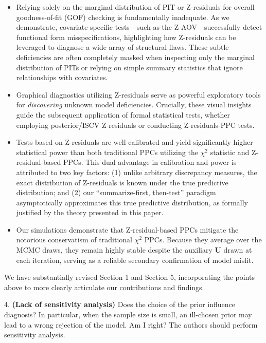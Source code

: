 \documentclass[11pt]{article}
\newcommand*{\mybox}[2]{\colorbox{#1!30}{\parbox{.98\linewidth}{#2}}}
\begin{document}
\begin{itemize}
    \item Relying solely on the marginal distribution of PIT or Z-residuals for overall goodness-of-fit (GOF) checking is fundamentally inadequate. As we demonstrate, covariate-specific tests---such as the Z-AOV---successfully detect functional form misspecifications, highlighting how Z-residuals can be leveraged to diagnose a wide array of structural flaws. These subtle deficiencies are often completely masked when inspecting only the marginal distribution of PITs or relying on simple summary statistics that ignore relationships with covariates.
    
    \item Graphical diagnostics utilizing Z-residuals serve as powerful exploratory tools for \textit{discovering} unknown model deficiencies. Crucially, these visual insights guide the subsequent application of formal statistical tests, whether employing posterior/ISCV Z-residuals or conducting Z-residuals-PPC tests.
    
    \item Tests based on Z-residuals are well-calibrated and yield significantly higher statistical power than both traditional PPCs utilizing the $\chi^2$ statistic and Z-residual-based PPCs. This dual advantage in calibration and power is attributed to two key factors: (1) unlike arbitrary discrepancy measures, the exact distribution of Z-residuals is known under the true predictive distribution; and (2) our ``summarize-first, then-test'' paradigm asymptotically approximates this true predictive distribution, as formally justified by the theory presented in this paper.
    
    \item Our simulations demonstrate that  Z-residual-based PPCs mitigate the notorious conservatism of traditional $\chi^2$ PPCs. Because they average over the MCMC draws, they remain highly stable despite the auxiliary $\bm{U}$ drawn at each iteration, serving as a reliable secondary confirmation of model misfit.
\end{itemize}

 We have substantially revised Section 1 and Section 5, incorporating the points above to more clearly articulate our contributions and findings.

\medskip

\mybox{gray}{4. \textbf{(Lack of sensitivity analysis)} Does the choice of the prior influence diagnosis? In particular, when the sample size is small, an ill-chosen prior may lead to a wrong rejection of the model. Am I right? The authors should perform sensitivity analysis.}
\end{document}
